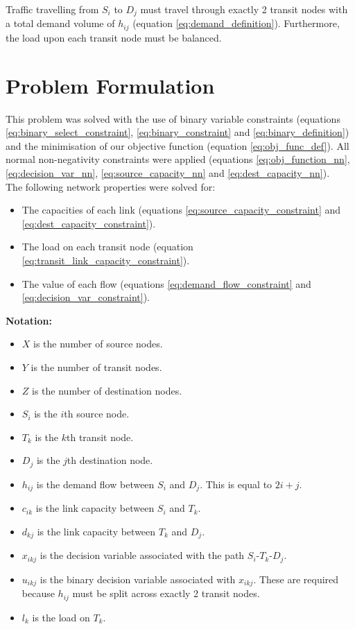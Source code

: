 \documentclass[12pt]{article} %
\begin{document}
Traffic travelling from $S_i$ to $D_j$ must travel through exactly 2 transit nodes with a total demand volume of $h_{ij}$ (equation \ref{eq:demand_definition}). Furthermore, the load upon each transit node must be balanced.

\section{Problem Formulation}

\noindent This problem was solved with the use of binary variable constraints (equations \ref{eq:binary_select_constraint}, \ref{eq:binary_constraint} and \ref{eq:binary_definition}) and the minimisation of our objective function (equation \ref{eq:obj_func_def}).
All normal non-negativity constraints were applied (equations \ref{eq:obj_function_nn}, \ref{eq:decision_var_nn}, \ref{eq:source_capacity_nn} and \ref{eq:dest_capacity_nn}).\\

\noindent The following network properties were solved for:
\begin{itemize}
	\item The capacities of each link (equations \ref{eq:source_capacity_constraint} and \ref{eq:dest_capacity_constraint}).
	\item The load on each transit node (equation \ref{eq:transit_link_capacity_constraint}).
	\item The value of each flow (equations \ref{eq:demand_flow_constraint} and \ref{eq:decision_var_constraint}).
\end{itemize}

\noindent \textbf{Notation:}
\begin{itemize}
\item $X$ is the number of source nodes.
\item $Y$ is the number of transit nodes.
\item $Z$ is the number of destination nodes.
\item $S_i$ is the $i$th source node.
\item $T_k$ is the $k$th transit node.
\item $D_j$ is the $j$th destination node.
\item $h_{ij}$ is the demand flow between $S_i$ and $D_j$. This is equal to $2i + j$.
\item $c_{ik}$ is the link capacity between $S_i$ and $T_k$.
\item $d_{kj}$ is the link capacity between $T_k$ and $D_j$.
\item $x_{ikj}$ is the decision variable associated with the path $S_i$-$T_k$-$D_j$.
\item $u_{ikj}$ is the binary decision variable associated with $x_{ikj}$. These are required because $h_{ij}$ must be split across exactly 2 transit nodes.
\item $l_{k}$ is the load on $T_k$.
\end{itemize}
\end{document}
